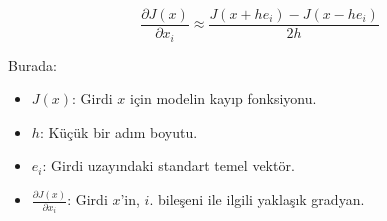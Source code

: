 \[ \frac{\partial J(x)}{\partial x_i} \approx \frac{J(x + h e_i) - J(x - h e_i)}{2h} \]

Burada:

\begin{itemize}
    \item $J(x)$: Girdi $x$ için modelin kayıp fonksiyonu.
    \item $h$: Küçük bir adım boyutu.
    \item $e_i$: Girdi uzayındaki standart temel vektör.
    \item $\frac{\partial J(x)}{\partial x_i}$: Girdi $x$'in, $i$. bileşeni ile ilgili yaklaşık gradyan.
\end{itemize}

\newpage